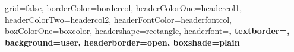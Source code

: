 \documentclass[a0paper,landscape]{baposter}
\begin{document}



\makeatletter
\renewcommand{\baposter@box@headerdrawtext@rectangle}[1]{
  \path (\baposter@box@name nw) +(0.5\boxwidth,-0.5\baposter@box@@boxheaderheight) node[anchor=center] {#1};%
}
\makeatother
\begin{poster}{
	grid=false,
	borderColor=bordercol,
	headerColorOne=headercol1,
	headerColorTwo=headercol2,
	headerFontColor=headerfontcol,
	boxColorOne=boxcolor,
	headershape=rectangle,
	headerfont=\Large\sf\bf\Centering,
	textborder=,
	background=user,
	headerborder=open,
    boxshade=plain
}
{
\setlength\fboxsep{0pt}
\setlength\fboxrule{0pt}
}

\end{poster}
\end{document}
